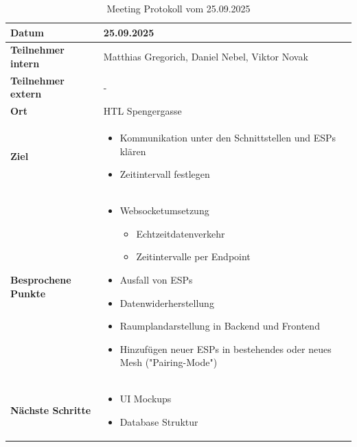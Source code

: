 \documentclass{article}
\begin{document}
\begin{table}[htbp]
  \centering
  \begin{tabularx}{\textwidth}{|>{\columncolor{black!10}}l|X|}
    \hline
    \textbf{Datum} & 25.09.2025 \\
    \hline
    \textbf{Teilnehmer intern} & Matthias Gregorich, Daniel Nebel, Viktor Novak \\ 
    \hline
    \textbf{Teilnehmer extern} & - \\
    \hline
    \textbf{Ort} & HTL Spengergasse \\ 
    \hline
    \textbf{Ziel} &
    \vspace{-0.5em}
    \begin{itemize}
        \item Kommunikation unter den Schnittstellen und ESPs klären
        \item Zeitintervall festlegen
    \end{itemize} \\
    \hline
    \textbf{Besprochene Punkte} &
    \vspace{-0.5em}
    \begin{itemize}
        \item Websocketumsetzung
          \begin{itemize}[label=-,leftmargin=1.2em,nosep,topsep=0pt]
            \item Echtzeitdatenverkehr
            \item Zeitintervalle per Endpoint
          \end{itemize}
        \item Ausfall von ESPs 
        \item Datenwiderherstellung
        \item Raumplandarstellung in Backend und Frontend
        \item Hinzufügen neuer ESPs in bestehendes oder neues Mesh ("Pairing-Mode")
    \end{itemize} \\
    \hline
    \textbf{Nächste Schritte} &
    \vspace{-0.5em}
    \begin{itemize}
        \item UI Mockups
        \item Database Struktur
    \end{itemize} \\
    \hline
  \end{tabularx}
  \caption{Meeting Protokoll vom 25.09.2025}
  \label{tab:meeting-25-09-2025}
\end{table}
\end{document}
